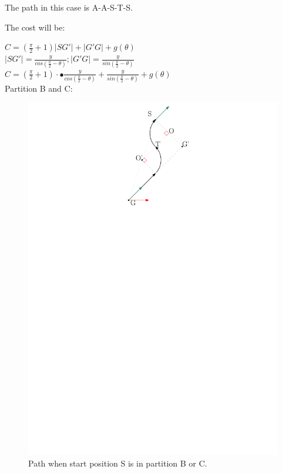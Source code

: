 \documentclass[12pt]{article}
\begin{document}
  The path in this case is A-A-S-T-S.
  
  The cost will be: 
  
  $C = (\frac{\pi}{2}+1)|SG'| + |G'G| + g(\theta)$\\
  
  $|SG'| = \frac{y}{cos( \frac{\pi}{2} - \theta )};    |G'G| = \frac{y}{sin( \frac{\pi}{2} - \theta )}$\\
  
  $C = (\frac{\pi}{2}+1) \cdot•\frac{y}{cos( \frac{\pi}{2} - \theta )} + \frac{y}{sin( \frac{\pi}{2} - \theta )} + g(\theta) $\\

  Partition B and C:
  
  \begin{figure}
  \centering
  \includegraphics[scale=1]{Diff_Drive_Gene_Case_3}
  \caption{Path when start position S is in partition B or C.}
  \end{figure}
  
\end{document}
